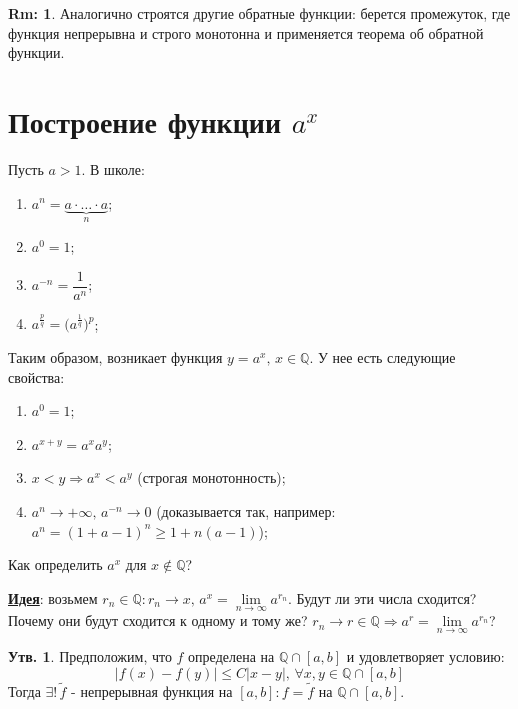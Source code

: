 \documentclass[12pt]{article}
\newcommand{\MQ}{\mathbb{Q}}
\theoremstyle{definition}
\newtheorem{rem}{Rm:}
\newtheorem{prop}{Утв.}
\begin{document}
\begin{rem}
	Аналогично строятся другие обратные функции: берется промежуток, где функция непрерывна и строго монотонна и применяется теорема об обратной функции.
\end{rem}
\newpage

\section*{Построение функции $a^x$}
Пусть $a > 1$. В школе: 
\begin{enumerate}
	\item $a^n = \underbrace{a\cdot \dotsc \cdot a}_{n}$;
	\item $a^0 = 1$;
	\item $a^{-n} = \dfrac{1}{a^{n}}$;
	\item $a^{\frac{p}{q}} = \Big( a^{\frac{1}{q}} \Big)^p$;
\end{enumerate}

Таким образом, возникает функция $y = a^x, \, x \in \MQ$. У нее есть следующие свойства:
\begin{enumerate}
	\item $a^0 = 1$;
	\item $a^{x+ y} = a^xa^y$;
	\item $x < y \Rightarrow a^x < a^y$ (строгая монотонность);
	\item $a^n \to +\infty, \, a^{-n} \to 0$ (доказывается так, например: $a^n = (1 + a -1)^n \geq 1 + n(a-1)$);
\end{enumerate}

Как определить $a^x$ для $x \notin \MQ$? 

\uline{\textbf{Идея}}: возьмем $r_n \in \MQ \colon r_n \to x, \, a^x = \lim\limits_{n \to \infty} a^{r_n}$. Будут ли эти числа сходится? Почему они будут сходится к одному и тому же? $r_n \to r \in \MQ \Rightarrow a^r = \lim\limits_{n \to \infty} a^{r_n}$?

\begin{prop}
	Предположим, что $f$ определена на $\MQ \cap [a,b]$ и удовлетворяет условию: 
	$$|f(x) - f(y)| \leq C |x-y|, \, \forall x,y \in \MQ \cap [a,b]$$ 
	Тогда $\exists! \, \tilde{f}$ - непрерывная функция на $[a,b] \colon f = \tilde{f}$ на $\MQ \cap [a,b]$.
\end{prop}
\end{document}
